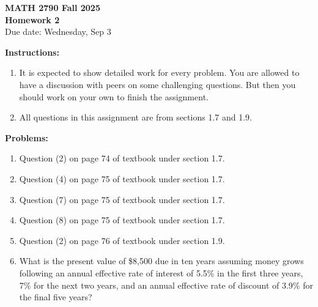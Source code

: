 \documentclass[12pt]{article}
\begin{document}
\begin{center}
\textbf{\Large MATH 2790 Fall 2025}\\[1em]
\textbf{\Large Homework 2}\\[0.5em]
Due date: Wednesday, Sep 3
\end{center}

\bigskip

\textbf{Instructions:}

\begin{enumerate}[label=(\alph*)]
\item It is expected to show detailed work for every problem. You are allowed to have a
discussion with peers on some challenging questions. But then you should work on
your own to finish the assignment.

\item All questions in this assignment are from sections 1.7 and 1.9.
\end{enumerate}

\bigskip

\textbf{Problems:}

\begin{enumerate}
\item Question (2) on page 74 of textbook under section 1.7.

\item Question (4) on page 75 of textbook under section 1.7.

\item Question (7) on page 75 of textbook under section 1.7. 

\item Question (8) on page 75 of textbook under section 1.7. 

\item Question (2) on page 76 of textbook under section 1.9.

\item What is the present value of \$8{,}500 due in ten years assuming money grows
following an annual effective rate of interest of 5.5\% in the first three years, 7\% for the next two
years, and an annual effective rate of discount of 3.9\% for the final five years?
\end{enumerate}
\end{document}
